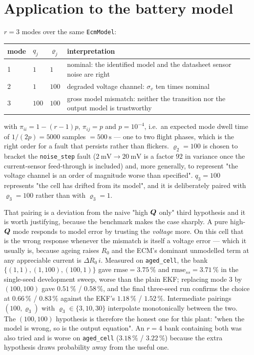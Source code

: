 \section{Application to the battery model}
\label{sec:imm:bank}
$r=3$ modes over the same \texttt{EcmModel}:
\begin{center}
\begin{tabular}{@{}lll>{\raggedright\arraybackslash}p{}@{}}
\toprule
mode & $q_j$ & $\varrho_j$ & interpretation \\
\midrule
1 & $1$   & $1$   & nominal: the identified model and the datasheet sensor noise are right \\
2 & $1$   & $100$ & degraded voltage channel: $\sigma_v$ ten times nominal \\
3 & $100$ & $100$ & gross model mismatch: neither the transition nor the output model is trustworthy \\
\bottomrule
\end{tabular}
\end{center}
with $\pi_{ii}=1-(r-1)p$, $\pi_{ij}=p$ and $p=10^{-4}$, i.e.\ an expected mode dwell time of
$1/(2p)=5000$ samples $=\SI{500}{\second}$ --- one to two flight phases, which is the right order for
a fault that persists rather than flickers.  $\varrho_2=100$ is chosen to bracket the
\texttt{noise\_step} fault ($\SI{2}{\milli\volt}\to\SI{20}{\milli\volt}$ is a factor $92$ in
variance once the current-sensor feed-through is included) and, more generally, to represent "the
voltage channel is an order of magnitude worse than specified".  $q_3=100$ represents "the cell has
drifted from its model", and it is deliberately paired with $\varrho_3=100$ rather than with
$\varrho_3=1$.

That pairing is a deviation from the naive "high $\bm{Q}$ only" third hypothesis and it is worth
justifying, because the benchmark makes the case sharply.  A pure high-$\bm{Q}$ mode responds to model
error by trusting the \emph{voltage} more.  On this cell that is the wrong response whenever the
mismatch is itself a voltage error --- which it usually is, because ageing raises $R_0$ and the ECM's
dominant unmodelled term at any appreciable current is $\Delta R_0\,i$.  Measured on
\texttt{aged\_cell}, the bank $\{(1,1),(1,100),(100,1)\}$ gave $\mathrm{rmse}=3.75\,\%$ and
$\mathrm{rmse}_{ss}=3.71\,\%$ in the single-seed development sweep, worse than the plain EKF;
replacing mode 3 by $(100,100)$ gave $0.51\,\%$ / $0.58\,\%$, and the final three-seed run confirms
the choice at $0.66\,\%$ / $0.83\,\%$ against the EKF's $1.18\,\%$ / $1.52\,\%$.  Intermediate pairings
$(100,\varrho_3)$ with $\varrho_3\in\{3,10,30\}$ interpolate monotonically between the two.  The
$(100,100)$ hypothesis is therefore the honest one for this plant: "when the model is wrong, so is
the output equation".  An $r=4$ bank containing both was also tried and is worse on
\texttt{aged\_cell} ($3.18\,\%$ / $3.22\,\%$) because the extra hypothesis draws probability away from
the useful one.

